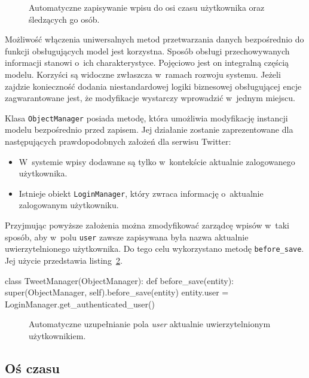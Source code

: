 \begin{figure}[ht!]
	\centering
	\theverbbox
	\caption{Automatyczne zapisywanie wpisu do osi czasu użytkownika oraz śledzących go osób.}
	\label{vrb:omc_twissandra_tweet_save}
\end{figure}

Możliwość włączenia uniwersalnych metod przetwarzania danych bezpośrednio do funkcji obsługujących model jest korzystna. Sposób obsługi przechowywanych informacji stanowi o~ich charakterystyce. Pojęciowo jest on  integralną częścią modelu. Korzyści są widoczne zwłaszcza w~ramach rozwoju systemu. Jeżeli zajdzie konieczność dodania niestandardowej logiki biznesowej obsługującej encje zagwarantowane jest, że modyfikacje wystarczy wprowadzić w~jednym miejscu.

Klasa \verb+ObjectManager+ posiada metodę, która umożliwia modyfikację instancji modelu bezpośrednio przed zapisem. Jej działanie zostanie zaprezentowane dla następujących prawdopodobnych założeń dla serwisu Twitter:

\begin{itemize}
	\item W~systemie wpisy dodawane są tylko w~kontekście aktualnie zalogowanego użytkownika.
	\item Istnieje obiekt \verb+LoginManager+, który zwraca informację o~aktualnie zalogowanym użytkowniku.
\end{itemize}

Przyjmując powyższe założenia można zmodyfikować zarządcę wpisów w~taki sposób, aby w~polu \verb+user+ zawsze zapisywana była nazwa aktualnie uwierzytelnionego użytkownika. Do tego celu wykorzystano metodę \verb+before_save+. Jej użycie przedstawia listing~\ref{vrb:omc_twissandra_tweet_pre_save}.

\begin{verbbox}
	class TweetManager(ObjectManager):
	    def before_save(entity):
	        super(ObjectManager, self).before_save(entity)
	        entity.user = LoginManager.get_authenticated_user()
\end{verbbox}

\begin{figure}[ht!]
	\centering
	\theverbbox
	\caption{Automatyczne uzupełnianie pola \emph{user} aktualnie uwierzytelnionym użytkownikiem.}
	\label{vrb:omc_twissandra_tweet_pre_save}
\end{figure}

\subsection{Oś czasu}

